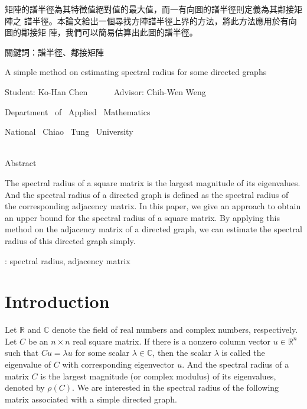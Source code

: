 \documentclass[12pt, a4paper]{article}
\theoremstyle{plain}
\theoremstyle{definition}
\begin{document}
 矩陣的譜半徑為其特徵值絕對值的最大值，而一有向圖的譜半徑則定義為其鄰接矩陣之
 譜半徑。本論文給出一個尋找方陣譜半徑上界的方法，將此方法應用於有向圖的鄰接矩
 陣，我們可以簡易估算出此圖的譜半徑。
 \\
\bigskip

\noindent 關鍵詞：譜半徑、鄰接矩陣
\pagebreak



\begin{center}{\LARGE
A simple method on estimating spectral radius for some directed graphs
\bigskip\bigskip\bigskip}

{ \large
Student: Ko-Han Chen  ~~~~~ Advisor: Chih-Wen Weng \\
\Large

Department ~of~ Applied ~Mathematics
\bigskip

National~ Chiao ~Tung~ University
\bigskip\bigskip\bigskip\bigskip}\\
{\large Abstract}
\end{center}

The spectral radius of a square matrix is the largest magnitude of its eigenvalues. And the
 spectral radius of a directed graph is defined as the spectral radius of the corresponding
 adjacency matrix. In this paper, we give an approach to obtain an upper bound for the
 spectral radius of a square matrix. By applying this method on the adjacency matrix of a
 directed graph, we can estimate the spectral radius of this directed graph simply.

\bigskip


: spectral radius, adjacency matrix
\pagebreak


\renewcommand{\baselinestretch}{1.2}
\large
\tableofcontents


\clearpage
{}
\linespread{1.5}

\setcounter{page}{1}
\section{Introduction}

Let $\mathbb{R}$ and $\mathbb{C}$ denote the
 field of real numbers and complex numbers, respectively.
 Let $C$ be an $n\times n$ real square matrix. If there is
 a nonzero column vector $u\in\mathbb{R}^n$ such that
 $Cu=\lambda u$ for some scalar $\lambda\in\mathbb{C}$,
 then the scalar $\lambda$ is called the eigenvalue of
 $C$ with corresponding eigenvector $u$. And the spectral
 radius of a matrix $C$ is the largest magnitude (or complex
 modulus) of its eigenvalues, denoted by $\rho(C)$. We are
 interested in the spectral radius of the following matrix
 associated with a simple directed graph.
\end{document}
